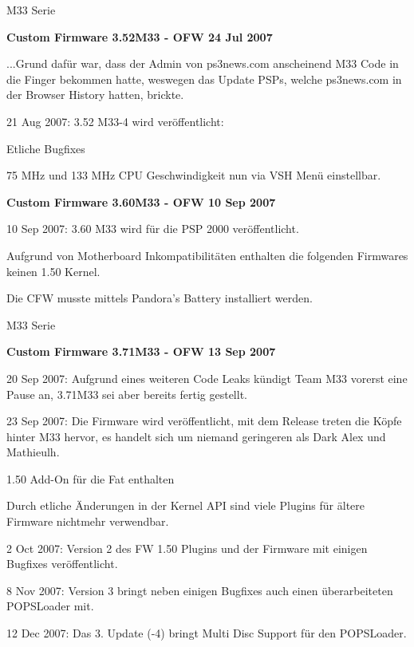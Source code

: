 \documentclass[mode=print,paper=screen,size=10pt,style=paintings]{powerdot}
\begin{document}
\begin{slide}{M33 Serie}
	\begin{large}\textbf{Custom Firmware 3.52M33 - OFW 24 Jul 2007}\end{large}\linebreak
	...Grund dafür war, dass der Admin von ps3news.com anscheinend M33 Code in die Finger bekommen hatte, weswegen das Update
	PSPs, welche ps3news.com in der Browser History hatten, brickte.
	\begin{list}{-}{}
		\item{21 Aug 2007: 3.52 M33-4 wird veröffentlicht:\begin{list}{*}{}
				\item{Etliche Bugfixes}
				\item{75 MHz und 133 MHz CPU Geschwindigkeit nun via VSH Menü einstellbar.}
			\end{list}}
	\end{list}
	\begin{large}\textbf{Custom Firmware 3.60M33 - OFW 10 Sep 2007}\end{large}
	\begin{list}{-}{}
		\item{10 Sep 2007: 3.60 M33 wird für die PSP 2000 veröffentlicht.}
		\item{Aufgrund von Motherboard Inkompatibilitäten enthalten die folgenden Firmwares keinen 1.50 Kernel.}
		\item{Die CFW musste mittels Pandora's Battery installiert werden.} 
	\end{list}
\end{slide}

\begin{slide}{M33 Serie}
	\begin{large}\textbf{Custom Firmware 3.71M33 - OFW 13 Sep 2007}\end{large}	
	\begin{list}{-}{}
		\item{20 Sep 2007: Aufgrund eines weiteren Code Leaks kündigt Team M33 vorerst eine Pause an, 3.71M33 sei aber bereits
			fertig gestellt.}
		\item{23 Sep 2007: Die Firmware wird veröffentlicht, mit dem Release treten die Köpfe hinter M33 hervor, es handelt sich
			um niemand geringeren als Dark Alex und Mathieulh.
			\begin{list}{*}{}
				\item{1.50 Add-On für die Fat enthalten}
				\item{Durch etliche Änderungen in der Kernel API sind viele Plugins für ältere Firmware nichtmehr verwendbar.}
			\end{list}}
		\item{2 Oct 2007: Version 2 des FW 1.50 Plugins und der Firmware mit einigen Bugfixes veröffentlicht.}
		\item{8 Nov 2007: Version 3 bringt neben einigen Bugfixes auch einen überarbeiteten POPSLoader mit.}
		\item{12 Dec 2007: Das 3. Update (-4) bringt Multi Disc Support für den POPSLoader.}
	\end{list}
\end{slide}
\end{document}
